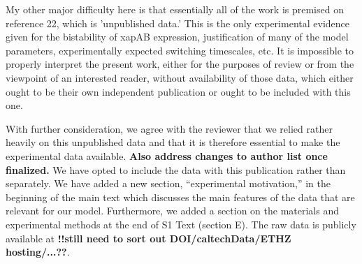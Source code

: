\documentclass[11pt,letterpaper]{article}
\begin{document}
\begin{review}
My other major difficulty here is that essentially all of the work is
premised on reference 22, which is 'unpublished data.' This is the only
experimental evidence given for the bistability of xapAB expression,
justification of many of the model parameters, experimentally expected
switching timescales, etc. It is impossible to properly interpret the
present work, either for the purposes of review or from the viewpoint of
an interested reader, without availability of those data, which either
ought to be their own independent publication or ought to be included
with this one.
\end{review}

\begin{response}
With further consideration, we agree with the reviewer that we relied
rather heavily on this unpublished data and that it is therefore
essential to make the experimental data available.
\textbf{Also address changes to author list once finalized.}
We have opted to include the data with this publication rather than
separately. We have added a new section, ``experimental motivation,'' in
the beginning of the main text which discusses the main features of the
data that are relevant for our model. Furthermore, we added a section on
the materials and experimental methods at the end of S1 Text (section
E).
The raw data is
publicly available at \textbf{!!still need to sort out
DOI/caltechData/ETHZ hosting/...??}.
\end{response}




\end{document}
